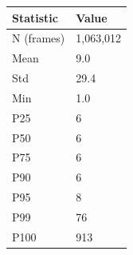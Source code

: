 \begin{tabular}{ll}
\toprule
Statistic & Value \\
\midrule
N (frames) & 1,063,012 \\
Mean & 9.0 \\
Std & 29.4 \\
Min & 1.0 \\
P25 & 6 \\
P50 & 6 \\
P75 & 6 \\
P90 & 6 \\
P95 & 8 \\
P99 & 76 \\
P100 & 913 \\
\bottomrule
\end{tabular}
